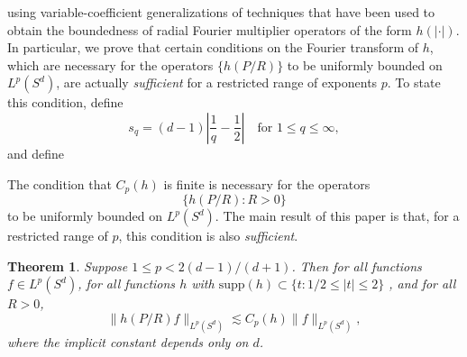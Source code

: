 \documentclass[dvipsnames,letterpaper,12pt]{article}
\newtheorem{theorem}{Theorem}
\begin{document}
 using variable-coefficient generalizations of techniques that have been used to obtain the boundedness of radial Fourier multiplier operators of the form $h(|\cdot|)$. In particular, we prove that certain conditions on the Fourier transform of $h$, which are necessary for the operators $\{ h(P/R) \}$ to be uniformly bounded on $L^p(S^d)$, are actually \emph{sufficient} for a restricted range of exponents $p$. To state this condition, define
%
\[ s_q = (d-1) \left| \frac{1}{q} - \frac{1}{2} \right| \quad\text{for $1 \leq q \leq \infty$}, \]
%
and define
%

%
The condition that $C_p(h)$ is finite is necessary for the operators
%
\[ \{ h(P/R) : R > 0 \} \]
%
to be uniformly bounded on $L^p(S^d)$. The main result of this paper is that, for a restricted range of $p$, this condition is also \emph{sufficient}.

\begin{theorem} \label{MainSphereTheorem}
    Suppose $1 \leq p < 2(d-1)/(d+1)$. Then for all functions $f \in L^p(S^d)$, for all functions $h$ with $\text{supp}(h) \subset \{ t : 1/2 \leq |t| \leq 2 \}$ , and for all $R > 0$,
    \[ \| h(P/R) f \|_{L^p(S^d)} \lesssim C_p(h) \| f \|_{L^p(S^d)}, \]
    where the implicit constant depends only on $d$.
\end{theorem}
\end{document}
